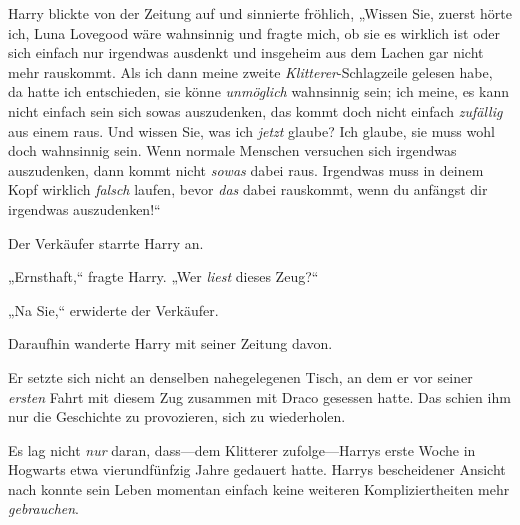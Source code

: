 Harry blickte von der Zeitung auf und sinnierte fröhlich, „Wissen Sie, zuerst hörte ich, Luna Lovegood wäre wahnsinnig und fragte mich, ob sie es wirklich ist oder sich einfach nur irgendwas ausdenkt und insgeheim aus dem Lachen gar nicht mehr rauskommt. Als ich dann meine zweite \emph{Klitterer}-Schlagzeile gelesen habe, da hatte ich entschieden, sie könne \emph{unmöglich} wahnsinnig sein; ich meine, es kann nicht einfach sein sich sowas auszudenken, das kommt doch nicht einfach \emph{zufällig} aus einem raus. Und wissen Sie, was ich \emph{jetzt} glaube? Ich glaube, sie muss wohl doch wahnsinnig sein. Wenn normale Menschen versuchen sich irgendwas auszudenken, dann kommt nicht \emph{sowas} dabei raus. Irgendwas muss in deinem Kopf wirklich \emph{falsch} laufen, bevor \emph{das} dabei rauskommt, wenn du anfängst dir irgendwas auszudenken!“

Der Verkäufer starrte Harry an.

„Ernsthaft,“ fragte Harry. „Wer \emph{liest} dieses Zeug?“

„Na Sie,“ erwiderte der Verkäufer.

Daraufhin wanderte Harry mit seiner Zeitung davon.

Er setzte sich nicht an denselben nahegelegenen Tisch, an dem er vor seiner \emph{ersten} Fahrt mit diesem Zug zusammen mit Draco gesessen hatte. Das schien ihm nur die Geschichte zu provozieren, sich zu wiederholen.

Es lag nicht \emph{nur} daran, dass—dem Klitterer zufolge—Harrys erste Woche in Hogwarts etwa vierundfünfzig Jahre gedauert hatte. Harrys bescheidener Ansicht nach konnte sein Leben momentan einfach keine weiteren Kompliziertheiten mehr \emph{gebrauchen}.

